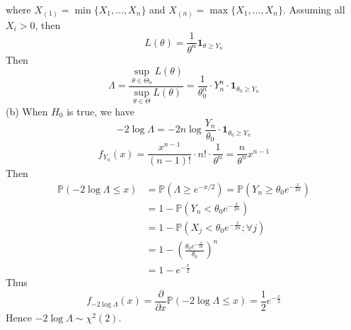 where $X_{(1)}=\min\{ X_1,\dots,X_n \}$ and $X_{(n)}=\max\{ X_1,\dots,X_n \}$. Assuming all $X_i>0$, then
\[
L(\theta)=\frac{1}{\theta^{n}}\mathbf{1}_{\theta\geq Y_n}
\]
Then
\[
\Lambda=\frac{\sup_{\theta\in\Theta_0}L(\theta)}{\sup_{\theta\in\Theta}L(\theta)}=\frac{1}{\theta^{n}_{0}}\cdot Y_n^{n}\cdot \mathbf{1}_{\theta_0\geq Y_n}
\]
(b)
When $H_0$ is true, we have
\[
-2\log\Lambda=-2n\log\frac{Y_n}{\theta_0}\cdot \mathbf{1}_{\theta_0\geq Y_n}
\]
\[
f_{Y_n}(x)=\frac{x^{n-1}}{(n-1)!}\cdot n!\cdot\frac{1}{\theta^{n}}=\frac{n}{\theta^{n}}x^{n-1}
\]
Then
\[
\begin{aligned}
\mathbb{P}(-2\log\Lambda\leq x) & =\mathbb{P}(\Lambda\geq e^{ -x/2  })=\mathbb{P}\left( Y_n\geq \theta_0e^{ -\frac{x}{2n} } \right) \\
 & =1-\mathbb{P}\left( Y_n<\theta_0e^{ -\frac{x}{2n} } \right) \\
 & =1-\mathbb{P}\left( X_j<\theta_0e^{ -\frac{x}{2n} };\forall j \right) \\
 & =1-\left( \frac{\theta_0e^{ -\frac{x}{2n} }}{\theta_0} \right)^{n} \\
 & =1-e^{ -\frac{x}{2} } 
\end{aligned}
\]
Thus
\[
f_{-2\log\Lambda}(x)=\frac{ \partial   }{ \partial x } \mathbb{P}(-2\log\Lambda\leq x)=\frac{1}{2}e^{ -\frac{x}{2} }
\]
Hence $-2\log\Lambda \sim \chi^{2}(2)$.

